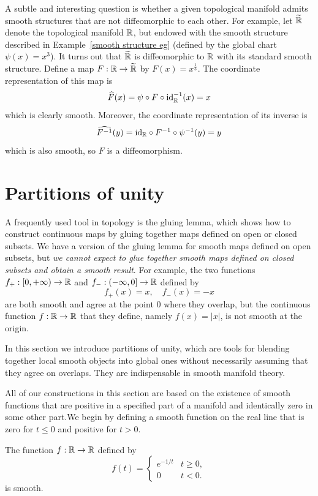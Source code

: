A subtle and interesting question is whether a given topological manifold
admits smooth structures that are not diffeomorphic to each other. For example, let $\widetilde{\mathbb{R}}$ denote the topological manifold $\mathbb{R}$, but endowed with the smooth structure described in Example~\ref{smooth structure eg} (defined by the global chart $\psi(x)=x^3$). It turns out that $\widetilde{\mathbb{R}}$ is diffeomorphic to $\mathbb{R}$ with its standard smooth structure. Define a map $F:\mathbb{R}\to\widetilde{\mathbb{R}}$ by $F(x)=x^{\frac{1}{3}}$. The coordinate representation of this map is
\[\widehat{F}(x)=\psi\circ F\circ\mathrm{id}_{\mathbb{R}}^{-1}(x)=x\]
which is clearly smooth. Moreover, the coordinate representation of its inverse is
\[\widehat{F^{-1}}(y)=\mathrm{id}_{\mathbb{R}}\circ F^{-1}\circ\psi^{-1}(y)=y\]
which is also smooth, so $F$ is a diffeomorphism.
\section{Partitions of unity}
A frequently used tool in topology is the gluing lemma, which shows
how to construct continuous maps by gluing together maps defined on open or closed subsets. We have a version of the gluing lemma for smooth maps defined on open subsets, but \textit{we cannot expect to glue together smooth maps
defined on closed subsets and obtain a smooth result}. For example, the two functions $f_+:[0,+\infty)\to\mathbb{R}$ and $f_-:(-\infty,0]\to\mathbb{R}$ defined by
\[f_+(x)=x,\quad f_-(x)=-x\]
are both smooth and agree at the point $0$ where they overlap, but the continuous function $f:\mathbb{R}\to\mathbb{R}$ that they define, namely $f(x)=|x|$, is not smooth at the origin.\par
In this section we introduce partitions of unity, which are tools
for blending together local smooth objects into global ones without necessarily assuming that they agree on overlaps. They are indispensable in smooth manifold theory.\par
All of our constructions in this section are based on the existence of smooth functions that are positive in a specified part of a manifold and identically zero in some other part.We begin by defining a smooth function on the real line that is zero for $t\leq0$ and positive for $t>0$.
\begin{lemma}
The function $f:\mathbb{R}\to\mathbb{R}$ defined by
\[f(t)=\begin{cases}
e^{-1/t}&t\geq 0,\\
0&t<0.
\end{cases}\]
is smooth.
\end{lemma}
